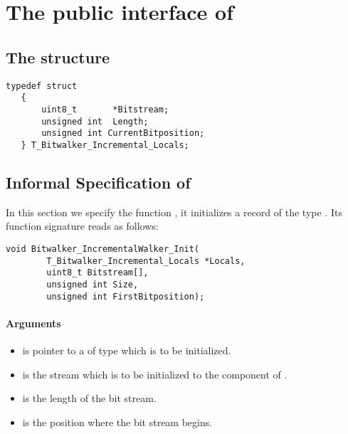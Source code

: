 

\section{The public interface of \bitwalker}

\subsection{The structure \bitwalkertype}



\begin{lstlisting}[style=acsl-block]
   typedef struct
   {
       uint8_t       *Bitstream;
       unsigned int  Length;
       unsigned int CurrentBitposition;
   } T_Bitwalker_Incremental_Locals;
\end{lstlisting}


\clearpage

\subsection{Informal Specification of }

In this section we specify the function \init,  it  initializes a record of the type \locals. Its function signature reads as follows:


\begin{lstlisting}[style=acsl-block]
void Bitwalker_IncrementalWalker_Init(
        T_Bitwalker_Incremental_Locals *Locals,
        uint8_t Bitstream[],
        unsigned int Size,
        unsigned int FirstBitposition);
\end{lstlisting}


\paragraph{Arguments}
\begin{itemize}
    \item  {} is pointer to a  of type \locals which is to be initialized.
   \item {} is  the stream which is to be initialized to the component  of .
   \item {} is the length of the bit stream.
   \item {} is the position where the bit stream begins.
\end{itemize}

